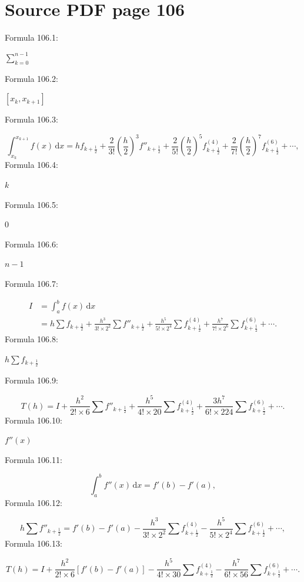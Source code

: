 \documentclass[11pt]{article}
\begin{document}
\clearpage
\section*{Source PDF page 106}
\noindent Formula 106.1:\par
$\displaystyle\sum_{k=0}^{n-1}$\par
\noindent Formula 106.2:\par
$[x_k,x_{k+1}]$\par
\noindent Formula 106.3:\par
\[
\int_{x_k}^{x_{k+1}}f(x)\,\mathrm{d}x
=hf_{k+\frac12}
+\frac{2}{3!}\left(\frac h2\right)^3f''_{k+\frac12}
+\frac{2}{5!}\left(\frac h2\right)^5f^{(4)}_{k+\frac12}
+\frac{2}{7!}\left(\frac h2\right)^7f^{(6)}_{k+\frac12}+\cdots,
\]
\noindent Formula 106.4:\par
$k$\par
\noindent Formula 106.5:\par
$0$\par
\noindent Formula 106.6:\par
$n-1$\par
\noindent Formula 106.7:\par
\[
\begin{aligned}
I&=\int_a^b f(x)\,\mathrm{d}x\\
&=h\sum f_{k+\frac12}
+\frac{h^3}{3!\times2^2}\sum f''_{k+\frac12}
+\frac{h^5}{5!\times2^4}\sum f^{(4)}_{k+\frac12}
+\frac{h^7}{7!\times2^6}\sum f^{(6)}_{k+\frac12}+\cdots.
\end{aligned}
\tag{4.3.16}
\]
\noindent Formula 106.8:\par
$h\sum f_{k+\frac12}$\par
\noindent Formula 106.9:\par
\[
T(h)=I+\frac{h^2}{2!\times6}\sum f''_{k+\frac12}
+\frac{h^5}{4!\times20}\sum f^{(4)}_{k+\frac12}
+\frac{3h^7}{6!\times224}\sum f^{(6)}_{k+\frac12}+\cdots.
\tag{4.3.17}
\]
\noindent Formula 106.10:\par
$f''(x)$\par
\noindent Formula 106.11:\par
\[
\int_a^b f''(x)\,\mathrm{d}x=f'(b)-f'(a),
\]
\noindent Formula 106.12:\par
\[
h\sum f''_{k+\frac12}=f'(b)-f'(a)
-\frac{h^3}{3!\times2^2}\sum f^{(4)}_{k+\frac12}
-\frac{h^5}{5!\times2^4}\sum f^{(6)}_{k+\frac12}+\cdots,
\]
\noindent Formula 106.13:\par
\[
T(h)=I+\frac{h^2}{2!\times6}[f'(b)-f'(a)]
-\frac{h^5}{4!\times30}\sum f^{(4)}_{k+\frac12}
-\frac{h^7}{6!\times56}\sum f^{(6)}_{k+\frac12}+\cdots.
\]
\end{document}
